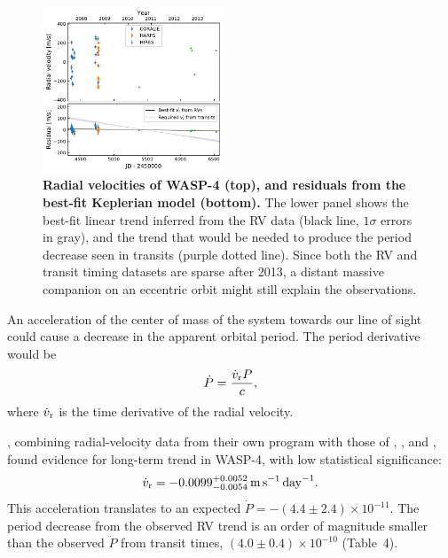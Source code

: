 \documentclass[12pt,twocolumn,tighten]{aastex62}
\begin{document}
\begin{figure}[t]
	\begin{center}
		\leavevmode
		\includegraphics[width=0.48\textwidth]{f6.pdf}
	\end{center}
	\vspace{-0.7cm}
	\caption{
    {\bf Radial velocities of WASP-4 (top), and residuals from the
    best-fit Keplerian model (bottom).} The lower panel shows the
    best-fit linear trend inferred from the RV data (black line,
    $1\sigma$ errors in gray), and the trend that would be needed to
    produce the period decrease seen in transits (purple dotted line).
    Since both the RV and transit timing datasets are sparse after
    2013, a distant massive companion on an eccentric orbit might
    still explain the observations.
	\label{fig:rvs}
  \vspace{-0.3cm}
	}
\end{figure}

An acceleration of the center of mass of the system towards our line
of sight could cause a decrease in the apparent orbital period.  The
period derivative would be
\begin{equation}
	\dot{P} = \frac{\dot{v}_{\rm r} P}{c},
\end{equation}
where $\dot{v}_{\rm r}$ is the time derivative of the radial velocity.

\citet{knutson_friends_2014}, combining radial-velocity data from
their own program with those of \citet{wilson_wasp-4b_2008},
\citet{pont_determining_2011}, and \citet{husnoo_observational_2012},
found evidence for long-term trend in WASP-4, with low statistical
significance:
\begin{equation}
  \dot{v}_{\rm r} =
     -0.0099^{+0.0052}_{-0.0054}
     \,{\rm m}\,{\rm s}^{-1}\,{\rm day}^{-1}.
\end{equation}
This acceleration translates to an expected $\dot{P} = -(4.4 \pm 2.4)
\times10^{-11}$. The period decrease from the observed RV trend is an
order of magnitude smaller than the observed $\dot{P}$ from transit
times, $(4.0\pm 0.4)\times10^{-10}$ (Table~4).
\end{document}
